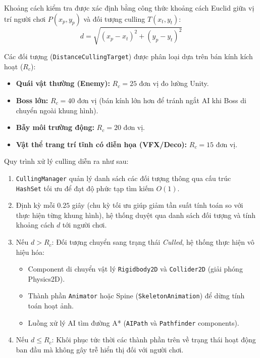 Khoảng cách kiểm tra được xác định bằng công thức khoảng cách Euclid giữa vị trí người chơi $P(x_p, y_p)$ và đối tượng culling $T(x_t, y_t)$:
\begin{equation}
d = \sqrt{(x_p - x_t)^2 + (y_p - y_t)^2}
\end{equation}

Các đối tượng (\texttt{DistanceCullingTarget}) được phân loại dựa trên bán kính kích hoạt ($R_c$):
\begin{itemize}
    \item \textbf{Quái vật thường (Enemy):} $R_c = 25$ đơn vị đo lường Unity.
    \item \textbf{Boss lớn:} $R_c = 40$ đơn vị (bán kính lớn hơn để tránh ngắt AI khi Boss di chuyển ngoài khung hình).
    \item \textbf{Bẫy môi trường động:} $R_c = 20$ đơn vị.
    \item \textbf{Vật thể trang trí tĩnh có diễn họa (VFX/Deco):} $R_c = 15$ đơn vị.
\end{itemize}

Quy trình xử lý culling diễn ra như sau:
\begin{enumerate}
    \item \texttt{CullingManager} quản lý danh sách các đối tượng thông qua cấu trúc \texttt{HashSet} tối ưu để đạt độ phức tạp tìm kiếm $O(1)$.
    \item Định kỳ mỗi $0.25$ giây (chu kỳ tối ưu giúp giảm tần suất tính toán so với thực hiện từng khung hình), hệ thống duyệt qua danh sách đối tượng và tính khoảng cách $d$ tới người chơi.
    \item Nếu $d > R_c$: Đối tượng chuyển sang trạng thái \textit{Culled}, hệ thống thực hiện vô hiệu hóa:
    \begin{itemize}
        \item Component di chuyển vật lý \texttt{Rigidbody2D} và \texttt{Collider2D} (giải phóng Physics2D).
        \item Thành phần \texttt{Animator} hoặc Spine (\texttt{SkeletonAnimation}) để dừng tính toán hoạt ảnh.
        \item Luồng xử lý AI tìm đường A* (\texttt{AIPath} và \texttt{Pathfinder} components).
    \end{itemize}
    \item Nếu $d \le R_c$: Khôi phục tức thời các thành phần trên về trạng thái hoạt động ban đầu mà không gây trễ hiển thị đối với người chơi.
\end{enumerate}

